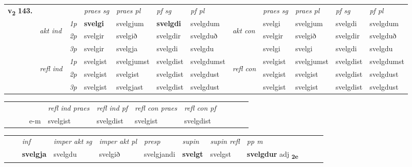 \begin{tabular}{llllllllllll} \toprule
\multirow{4}{*}{{{\textbf{v{\textsubscript{2}}} \Large{\textbf{143.}}}}}  & &   &  \textit{praes sg}  & \textit{praes pl}  &\textit{ pf sg} & \textit{pf pl} &  &  \textit{praes sg}  & \textit{praes pl}  & \textit{pf sg} & \textit{pf pl } \\*
	\cmidrule{4-7} \cmidrule{9-12}
 & \multirow{3}{*}{\begin{turn}{90}\textit{akt ind}\end{turn}} & {\textit{1p}} & \textbf{svelgi} & svelgjum    & \textbf{svelgdi} & svelgdum & \multirow{3}{*}{\begin{turn}{90}\textit{akt con}\end{turn}} &svelgi & svelgjum & svelgdi & svelgdum\\*
& &  {\textit{2p}} &  svelgir  & svelgið   & svelgdir & svelgduð & & svelgir & svelgið & svelgdir & svelgduð \\*
& &  {\textit{3p}} & svelgir & svelgja   & svelgdi & svelgdu & & svelgi & svelgi& svelgdi & svelgdu  \\*
\cmidrule{4-7} \cmidrule{9-12}
 &\multirow{3}{*}{\begin{turn}{90}\textit{refl ind}\end{turn}} & {\textit{1p}} & svelgist & svelgjumst    & svelgdist & svelgdumst & \multirow{3}{*}{\begin{turn}{90}\textit{refl con}\end{turn}}  &svelgist & svelgjumst & svelgdist & svelgdumst\\*
 &&  {\textit{2p}} &  svelgist  & svelgist   & svelgdist & svelgdust & &svelgist & svelgist & svelgdist & svelgdust \\*
& &  {\textit{3p}} & svelgist & svelgjast   & svelgdist & svelgdust & & svelgist & svelgist& svelgdist & svelgdust  \\*
\cmidrule{4-7} \cmidrule{9-12}
\end{tabular}


\begin{tabular}{llllllllllll}
 & &  & &  \textit{refl ind praes} & \textit{refl ind pf} & \textit{refl con praes} & \textit{refl con pf} \\*
&  & & e-m & svelgist & svelgdist & svelgist & svelgdist \\*
\cmidrule{5-9}
\end{tabular}


\begin{tabular}{llllllllllll}
 & & \textit{inf} & \textit{imper akt sg} & \textit{imper akt pl}   & \textit{presp} & \textit{supin} & \textit{supin refl} & \textit{pp m}     \\*
  & & \textbf{svelgja} & svelgdu  & svelgið   & svelgjandi &  \textbf{svelgt} & svelgst & \textbf{svelgdur} adj \textbf{\textsubscript{2e}} \\*
\cmidrule{1-12}
\end{tabular}



